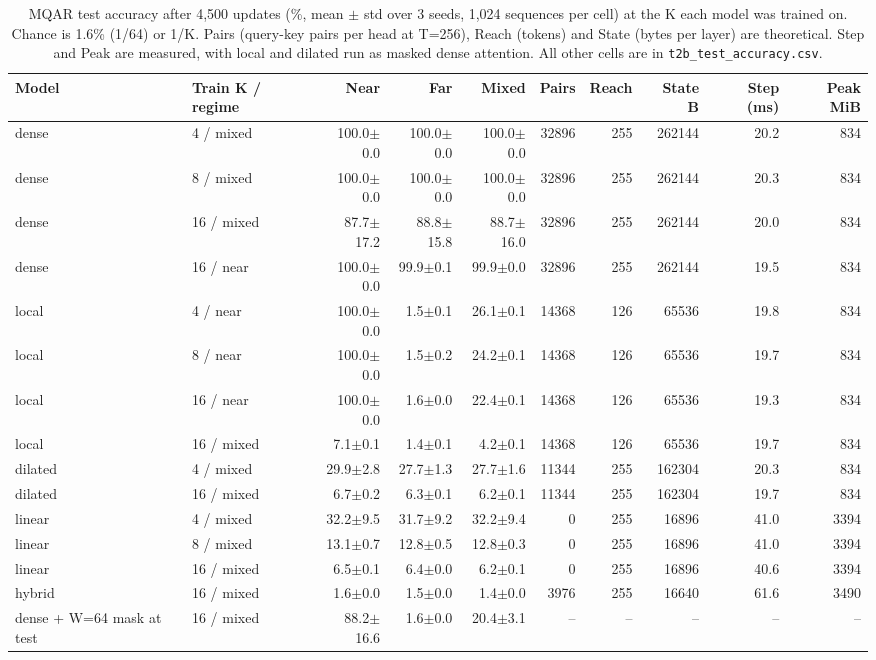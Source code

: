 \begin{table}[!htb]
\centering
\scriptsize
\setlength{\tabcolsep}{3.5pt}
\caption{MQAR test accuracy after 4,500 updates (\%, mean $\pm$ std over 3 seeds, 1,024 sequences per cell) at the K each model was trained on. Chance is 1.6\% (1/64) or 1/K. Pairs (query-key pairs per head at T=256), Reach (tokens) and State (bytes per layer) are theoretical. Step and Peak are measured, with local and dilated run as masked dense attention. All other cells are in \texttt{t2b\_test\_accuracy.csv}.}
\label{tab:t2bmain}
\begin{adjustbox}{max width=\linewidth}
\begin{tabular}{llrrrrrrrr}
\toprule
Model & Train K / regime & Near & Far & Mixed & Pairs & Reach & State B & Step (ms) & Peak MiB \\
\midrule
dense & 4 / mixed & 100.0$\pm$0.0 & 100.0$\pm$0.0 & 100.0$\pm$0.0 & 32896 & 255 & 262144 & 20.2 & 834 \\
dense & 8 / mixed & 100.0$\pm$0.0 & 100.0$\pm$0.0 & 100.0$\pm$0.0 & 32896 & 255 & 262144 & 20.3 & 834 \\
dense & 16 / mixed & 87.7$\pm$17.2 & 88.8$\pm$15.8 & 88.7$\pm$16.0 & 32896 & 255 & 262144 & 20.0 & 834 \\
dense & 16 / near & 100.0$\pm$0.0 & 99.9$\pm$0.1 & 99.9$\pm$0.0 & 32896 & 255 & 262144 & 19.5 & 834 \\
local & 4 / near & 100.0$\pm$0.0 & 1.5$\pm$0.1 & 26.1$\pm$0.1 & 14368 & 126 & 65536 & 19.8 & 834 \\
local & 8 / near & 100.0$\pm$0.0 & 1.5$\pm$0.2 & 24.2$\pm$0.1 & 14368 & 126 & 65536 & 19.7 & 834 \\
local & 16 / near & 100.0$\pm$0.0 & 1.6$\pm$0.0 & 22.4$\pm$0.1 & 14368 & 126 & 65536 & 19.3 & 834 \\
local & 16 / mixed & 7.1$\pm$0.1 & 1.4$\pm$0.1 & 4.2$\pm$0.1 & 14368 & 126 & 65536 & 19.7 & 834 \\
dilated & 4 / mixed & 29.9$\pm$2.8 & 27.7$\pm$1.3 & 27.7$\pm$1.6 & 11344 & 255 & 162304 & 20.3 & 834 \\
dilated & 16 / mixed & 6.7$\pm$0.2 & 6.3$\pm$0.1 & 6.2$\pm$0.1 & 11344 & 255 & 162304 & 19.7 & 834 \\
linear & 4 / mixed & 32.2$\pm$9.5 & 31.7$\pm$9.2 & 32.2$\pm$9.4 & 0 & 255 & 16896 & 41.0 & 3394 \\
linear & 8 / mixed & 13.1$\pm$0.7 & 12.8$\pm$0.5 & 12.8$\pm$0.3 & 0 & 255 & 16896 & 41.0 & 3394 \\
linear & 16 / mixed & 6.5$\pm$0.1 & 6.4$\pm$0.0 & 6.2$\pm$0.1 & 0 & 255 & 16896 & 40.6 & 3394 \\
hybrid & 16 / mixed & 1.6$\pm$0.0 & 1.5$\pm$0.0 & 1.4$\pm$0.0 & 3976 & 255 & 16640 & 61.6 & 3490 \\
\midrule
dense + W=64 mask at test & 16 / mixed & 88.2$\pm$16.6 & 1.6$\pm$0.0 & 20.4$\pm$3.1 & -- & -- & -- & -- & -- \\
\bottomrule
\end{tabular}
\end{adjustbox}
\end{table}
